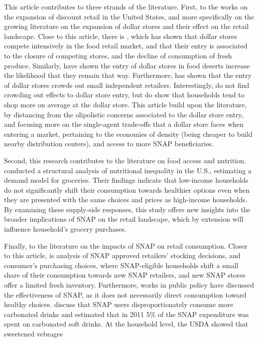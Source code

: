 \documentclass[11.5pt]{article}
\begin{document}
This article contributes to three strands of the literature. First, to the works on the expansion of discount retail in the United States, and more specifically on the growing literature on the expansion of dollar stores and their effect on the retail landscape. Close to this article, there is  \citeauthor{caoui2022impact} \citeyear{caoui2022impact}, which has shown that dollar stores compete intensively in the food retail market, and that their entry is associated to the closure of competing stores, and the decline of consumption of fresh produce. Similarly,  \citeauthor{chenarides2021dollar} \citeyear{chenarides2021dollar} have shown the entry of dollar stores in food deserts increase the likelihood that they remain that way. Furthermore, \citeauthor{chenarides2024dynamic} \citeyear{chenarides2024dynamic} has shown that the entry of dollar stores crowds out small independent retailers. Interestingly, \citeauthor{schneier2023buck} \citeyear{schneier2023buck} do not find crowding out effects to dollar store entry, but do show that households tend to shop more on average at the dollar store. This article build upon the literature, by distancing from the olipolistic concerns associated to the dollar store entry, and focusing more on the single-agent trade-offs that a dollar store faces when entering a market, pertaining to the economies of density (being cheaper to build nearby distribution centers), and access to more SNAP beneficiaries.

Second, this research contributes to the literature on food access and nutrition. \citeauthor{allcott2019food} \citeyear{allcott2019food} conducted a structural analysis of nutritional inequality in the U.S., estimating a demand model for groceries. Their findings indicate that low-income households do not significantly shift their consumption towards healthier options even when they are presented with the same choices and prices as high-income households. By examining these supply-side responses, this study offers new insights into the broader implications of SNAP on the retail landscape, which by extension will influence household's grocery purchases. 


Finally, to the literature on the impacts of SNAP on retail consumption. Closer to this article,  is \citeauthor{byrne2022welfare} \citeyear{byrne2022welfare} analysis of SNAP approved retailers' stocking decisions, and consumer's purchasing choices, where SNAP-eligible households shift a small share of their consumption towards new SNAP retailers, and new SNAP stores offer a limited fresh inventory. Furthermore, works in public policy have discussed the effectiveness of SNAP, as it does not necessarily direct consumption toward healthy choices. \citeauthor{shenkin2010using} \citeyear{shenkin2010using} discuss that SNAP users disproportionately consume more carbonated drinks and estimated that in 2011 5\% of the SNAP expenditure was spent on carbonated soft drinks. At the household level, the USDA \citeyear{usdareport} showed that sweetened vebrages 
\end{document}
